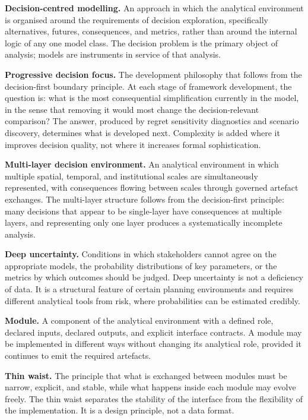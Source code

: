 \documentclass[
  11pt,
  a4paper,
  twoside,
  openright]{scrbook}
\begin{document}
\textbf{Decision-centred modelling.} An approach in which the analytical
environment is organised around the requirements of decision
exploration, specifically alternatives, futures, consequences, and
metrics, rather than around the internal logic of any one model class.
The decision problem is the primary object of analysis; models are
instruments in service of that analysis.

\textbf{Progressive decision focus.} The development philosophy that
follows from the decision-first boundary principle. At each stage of
framework development, the question is: what is the most consequential
simplification currently in the model, in the sense that removing it
would most change the decision-relevant comparison? The answer, produced
by regret sensitivity diagnostics and scenario discovery, determines
what is developed next. Complexity is added where it improves decision
quality, not where it increases formal sophistication.

\textbf{Multi-layer decision environment.} An analytical environment in
which multiple spatial, temporal, and institutional scales are
simultaneously represented, with consequences flowing between scales
through governed artefact exchanges. The multi-layer structure follows
from the decision-first principle: many decisions that appear to be
single-layer have consequences at multiple layers, and representing only
one layer produces a systematically incomplete analysis.

\textbf{Deep uncertainty.} Conditions in which stakeholders cannot agree
on the appropriate models, the probability distributions of key
parameters, or the metrics by which outcomes should be judged. Deep
uncertainty is not a deficiency of data. It is a structural feature of
certain planning environments and requires different analytical tools
from risk, where probabilities can be estimated credibly.

\textbf{Module.} A component of the analytical environment with a
defined role, declared inputs, declared outputs, and explicit interface
contracts. A module may be implemented in different ways without
changing its analytical role, provided it continues to emit the required
artefacts.

\textbf{Thin waist.} The principle that what is exchanged between
modules must be narrow, explicit, and stable, while what happens inside
each module may evolve freely. The thin waist separates the stability of
the interface from the flexibility of the implementation. It is a design
principle, not a data format.
\end{document}

